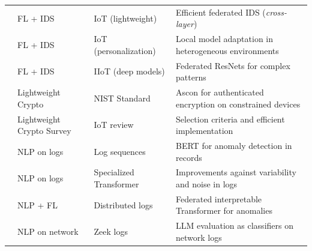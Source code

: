 \begin{longtable}{@{}p{} p{} p{} p{}@{}}
\cite{Hajj2023_CrossLayerFL_IDS} & FL + IDS & IoT (lightweight) & Efficient federated IDS (\textit{cross-layer}) \\
\addlinespace

\cite{Roy2023_FL_AdaptedModel} & FL + IDS & IoT (personalization) & Local model adaptation in heterogeneous environments \\
\addlinespace

\cite{Chaurasia2024_FL_ResNet_IIoT} & FL + IDS & IIoT (deep models) & Federated ResNets for complex patterns \\
\addlinespace

\cite{NIST_SP800232_2025} & Lightweight Crypto & NIST Standard & Ascon for authenticated encryption on constrained devices \\
\addlinespace

\cite{Gusita2025_LWC_Survey} & Lightweight Crypto Survey & IoT review & Selection criteria and efficient implementation \\
\addlinespace

\cite{LogBERT2021} & NLP on logs & Log sequences & BERT for anomaly detection in records \\
\addlinespace

\cite{LTAnomaly2023} & NLP on logs & Specialized Transformer & Improvements against variability and noise in logs \\
\addlinespace

\cite{NDSS2022_FedTransLog} & NLP + FL & Distributed logs & Federated interpretable Transformer for anomalies \\
\addlinespace

\cite{Yadav2023_LLM_Zeek} & NLP on network & Zeek logs & LLM evaluation as classifiers on network logs \\
\end{longtable}

\newpage
